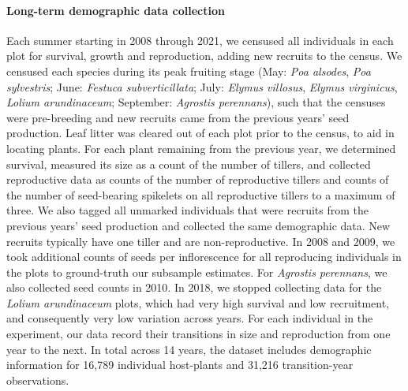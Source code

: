 \documentclass[12pt]{article}
\begin{document}
\paragraph*{Long-term demographic data collection}
Each summer starting in 2008 through 2021, we censused all individuals in each plot for survival, growth and reproduction,  adding new recruits to the census.
We censused each species during its peak fruiting stage (May: \emph{Poa alsodes}, \emph{Poa sylvestris}; June: \emph{Festuca subverticillata}; July: \emph{Elymus villosus}, \emph{Elymus virginicus}, \emph{Lolium arundinaceum}; September: \emph{Agrostis perennans}), such that the censuses were pre-breeding and new recruits came from the previous years' seed production.
Leaf litter was cleared out of each plot prior to the census, to aid in locating plants.
For each plant remaining from the previous year, we determined survival, measured its size as a count of the number of tillers, and collected reproductive data as counts of the number of reproductive tillers and counts of the number of seed-bearing spikelets on all reproductive tillers to a maximum of three. 
We also tagged all unmarked individuals that were recruits from the previous years' seed production and collected the same demographic data.
New recruits typically have one tiller and are non-reproductive. 
In 2008 and 2009, we took additional counts of seeds per inflorescence for all reproducing individuals in the plots to ground-truth our subsample estimates. 
For \emph{Agrostis perennans}, we also collected seed counts in 2010.
In 2018, we stopped collecting data for the \emph{Lolium arundinaceum} plots, which had very high survival and low recruitment, and consequently very low variation across years.
For each individual in the experiment, our data record their transitions in size and reproduction from one year to the next. 
In total across 14 years, the dataset includes demographic information for 16,789 individual host-plants and 31,216 transition-year observations.
\end{document}
